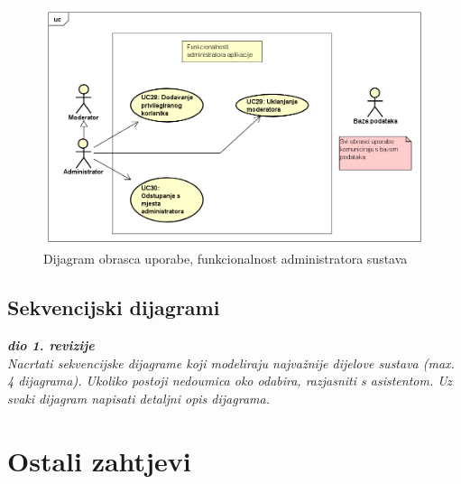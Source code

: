 \begin{figure}[H]
	\includegraphics[scale=0.4]{slike/DijagramObrazacaUporabe3.PNG}
	\centering
	\caption{Dijagram obrasca uporabe, funkcionalnost administratora sustava}
	\label{fig:obrazac_uporabe3}
\end{figure}

\eject	

\subsection{Sekvencijski dijagrami}

\textbf{\textit{dio 1. revizije}}\\

\textit{Nacrtati sekvencijske dijagrame koji modeliraju najvažnije dijelove sustava (max. 4 dijagrama). Ukoliko postoji nedoumica oko odabira, razjasniti s asistentom. Uz svaki dijagram napisati detaljni opis dijagrama.}
\eject

\section{Ostali zahtjevi}

